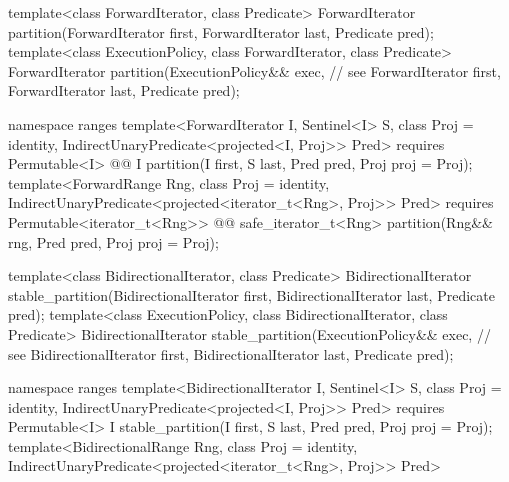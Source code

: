\begin{codeblock}
  template<class ForwardIterator, class Predicate>
    ForwardIterator partition(ForwardIterator first,
                              ForwardIterator last,
                              Predicate pred);
  template<class ExecutionPolicy, class ForwardIterator, class Predicate>
    ForwardIterator partition(ExecutionPolicy&& exec, // see 
                              ForwardIterator first,
                              ForwardIterator last,
                              Predicate pred);
\end{codeblock}\begin{addedblock}\begin{codeblock}
  namespace ranges {
    template<ForwardIterator I, Sentinel<I> S, class Proj = identity,
        IndirectUnaryPredicate<projected<I, Proj>> Pred>
      requires Permutable<I>
      @@ I
        partition(I first, S last, Pred pred, Proj proj = Proj{});
    template<ForwardRange Rng, class Proj = identity,
        IndirectUnaryPredicate<projected<iterator_t<Rng>, Proj>> Pred>
      requires Permutable<iterator_t<Rng>>
      @@ safe_iterator_t<Rng>
        partition(Rng&& rng, Pred pred, Proj proj = Proj{});
  }
\end{codeblock}\end{addedblock}\begin{codeblock}
  template<class BidirectionalIterator, class Predicate>
    BidirectionalIterator stable_partition(BidirectionalIterator first,
                                           BidirectionalIterator last,
                                           Predicate pred);
  template<class ExecutionPolicy, class BidirectionalIterator, class Predicate>
    BidirectionalIterator stable_partition(ExecutionPolicy&& exec, // see 
                                           BidirectionalIterator first,
                                           BidirectionalIterator last,
                                           Predicate pred);
\end{codeblock}\begin{addedblock}\begin{codeblock}
  namespace ranges {
    template<BidirectionalIterator I, Sentinel<I> S, class Proj = identity,
        IndirectUnaryPredicate<projected<I, Proj>> Pred>
      requires Permutable<I>
      I stable_partition(I first, S last, Pred pred, Proj proj = Proj{});
    template<BidirectionalRange Rng, class Proj = identity,
        IndirectUnaryPredicate<projected<iterator_t<Rng>, Proj>> Pred>
}
\end{codeblock}
\end{addedblock}
